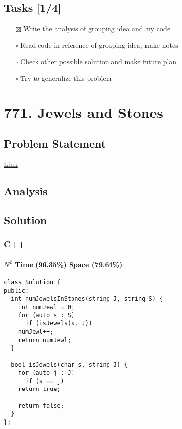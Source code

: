 \documentclass[12pt]{book}
\begin{document}
\section{Tasks [1/4]}
\label{sec:orgc4209f1}
\begin{itemize}
\item[{$\boxtimes$}] Write the analysis of grouping idea and my code
\item[{$\square$}] Read code in reference of grouping idea, make notes
\item[{$\square$}] Check other possible solution and make future plan
\item[{$\square$}] Try to generalize this problem
\end{itemize}
\chapter{771. Jewels and Stones}
\label{sec:orgeac3fc7}
\section{Problem Statement}
\label{sec:orgf77c3c7}
\href{https://leetcode.com/problems/jewels-and-stones/}{Link}
\section{Analysis}
\label{sec:org452d013}
\section{Solution}
\label{sec:org2248d5d}
\subsection{C++}
\label{sec:org87057f4}
\subsubsection{\(N^2\) Time (96.35\%) Space (79.64\%)}
\label{sec:org564e258}
\begin{verbatim}
class Solution {
public:
  int numJewelsInStones(string J, string S) {
    int numJewl = 0;
    for (auto s : S)
      if (isJewels(s, J))
	numJewl++;
    return numJewl;
  }

  bool isJewels(char s, string J) {
    for (auto j : J)
      if (s == j)
	return true;

    return false;
  }
};
\end{verbatim}
\end{document}
